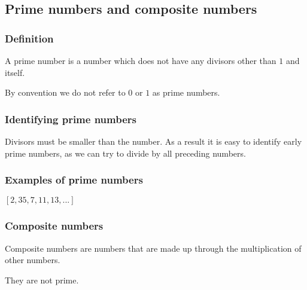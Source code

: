 
\subsection{Prime numbers and composite numbers}

\subsubsection{Definition}

A prime number is a number which does not have any divisors other than \(1\) and itself.

By convention we do not refer to \(0\) or \(1\) as prime numbers.

\subsubsection{Identifying prime numbers}

Divisors must be smaller than the number. As a result it is easy to identify early prime numbers, as we can try to divide by all preceding numbers.

\subsubsection{Examples of prime numbers}

\([2, 3 5, 7, 11, 13,...]\)

\subsubsection{Composite numbers}

Composite numbers are numbers that are  made up through the multiplication of other numbers.

They are not prime.


